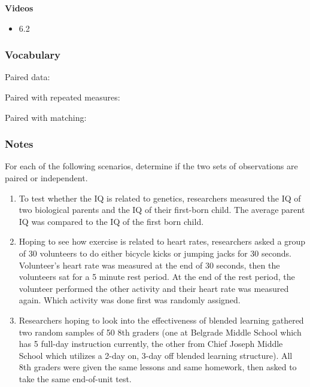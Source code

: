 \documentclass[
]{report}
\providecommand{\tightlist}{%
  \setlength{\itemsep}{0pt}\setlength{\parskip}{0pt}}
\newcommand{\rgs}{\vspace{12pt}} %
\newcommand{\rgi}{\hspace{24pt}}  %
\begin{document}

\textbf{Videos}

\begin{itemize}
\tightlist
\item
  6.2
\end{itemize}


\hypertarget{vocabulary-18}{%
\subsubsection*{Vocabulary}\label{vocabulary-18}}

Paired data:
\rgs

\rgi Paired with repeated measures:
\rgs

\rgi Paired with matching:
\rgs

\hypertarget{notes-25}{%
\subsubsection*{Notes}\label{notes-25}}

For each of the following scenarios, determine if the two sets of observations are paired or independent.

\begin{enumerate}
\def\labelenumi{\arabic{enumi}.}
\item
  To test whether the IQ is related to genetics, researchers measured the IQ of two biological parents and the IQ of their first-born child. The average parent IQ was compared to the IQ of the first born child.
  \rgs
\item
  Hoping to see how exercise is related to heart rates, researchers asked a group of 30 volunteers to do either bicycle kicks or jumping jacks for 30 seconds. Volunteer's heart rate was measured at the end of 30 seconds, then the volunteers sat for a 5 minute rest period. At the end of the rest period, the volunteer performed the other activity and their heart rate was measured again. Which activity was done first was randomly assigned.
  \rgs
\item
  Researchers hoping to look into the effectiveness of blended learning gathered two random samples of 50 8th graders (one at Belgrade Middle School which has 5 full-day instruction currently, the other from Chief Joseph Middle School which utilizes a 2-day on, 3-day off blended learning structure). All 8th graders were given the same lessons and same homework, then asked to take the same end-of-unit test.
  \rgs
\end{enumerate}
\end{document}
